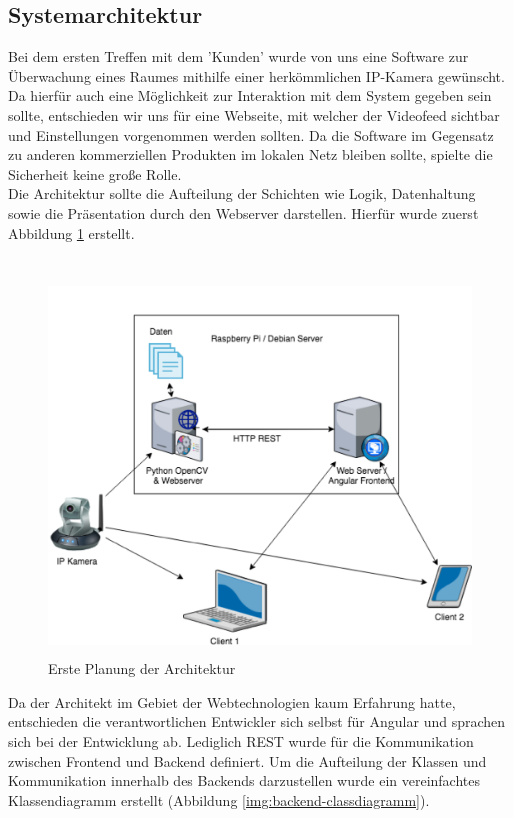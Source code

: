\subsection{Systemarchitektur}
Bei dem ersten Treffen mit dem 'Kunden' wurde von uns eine Software zur Überwachung eines Raumes mithilfe einer herkömmlichen IP-Kamera gewünscht.
Da hierfür auch eine Möglichkeit zur Interaktion mit dem System gegeben sein sollte, entschieden wir uns für eine Webseite, mit welcher
der Videofeed sichtbar und Einstellungen vorgenommen werden sollten. Da die Software im Gegensatz zu anderen kommerziellen Produkten im lokalen Netz bleiben sollte,
spielte die Sicherheit keine große Rolle.\\
Die Architektur sollte die Aufteilung der Schichten wie Logik, Datenhaltung sowie die Präsentation durch den Webserver darstellen.
Hierfür wurde zuerst Abbildung \ref{img:architecture-sketch} erstellt.\\\\
\begin{figure}[h]
	\centering
	\includegraphics[height=10cm]{content/pictures/architecture-sketch.png}
	\caption{Erste Planung der Architektur}
	\label{img:architecture-sketch}
\end{figure}
Da der Architekt im Gebiet der Webtechnologien kaum Erfahrung hatte, entschieden die verantwortlichen Entwickler sich selbst für Angular und sprachen sich bei
der Entwicklung ab. Lediglich REST wurde für die Kommunikation zwischen Frontend und Backend definiert. 
Um die Aufteilung der Klassen und Kommunikation innerhalb des Backends darzustellen wurde ein vereinfachtes Klassendiagramm erstellt (Abbildung \ref{img:backend-classdiagramm}).\\
